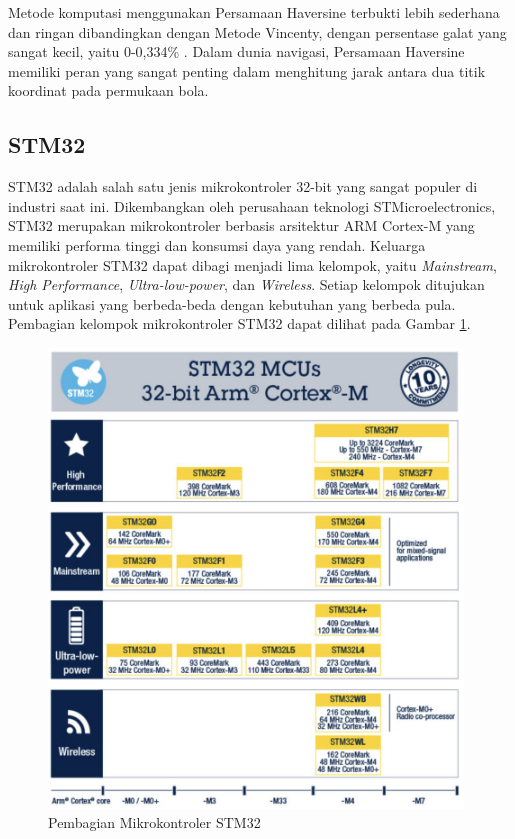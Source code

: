 Metode komputasi menggunakan Persamaan Haversine terbukti lebih sederhana dan ringan dibandingkan dengan Metode Vincenty, dengan persentase galat yang sangat kecil, yaitu 0-0,334\% \cite{Mahmoud2016}. Dalam dunia navigasi, Persamaan Haversine memiliki peran yang sangat penting dalam menghitung jarak antara dua titik koordinat pada permukaan bola.

\subsection{STM32}
STM32 adalah salah satu jenis mikrokontroler 32-bit yang sangat populer di industri saat ini. Dikembangkan oleh perusahaan teknologi STMicroelectronics, STM32 merupakan mikrokontroler berbasis arsitektur ARM Cortex-M yang memiliki performa tinggi dan konsumsi daya yang rendah. Keluarga mikrokontroler STM32 dapat dibagi menjadi lima kelompok, yaitu \textit{Mainstream}, \textit{High Performance}, \textit{Ultra-low-power}, dan \textit{Wireless}. Setiap kelompok ditujukan untuk aplikasi yang berbeda-beda dengan kebutuhan yang berbeda pula. Pembagian kelompok mikrokontroler STM32 dapat dilihat pada Gambar \ref{Fig: stm32-groups}.

\begin{figure}[H]
	\centering
	\includegraphics[width=11cm]{contents/chapter-2/stm-32-groups.png}
	\caption{Pembagian Mikrokontroler STM32 \cite{STMicroelectronics2023}}
	\label{Fig: stm32-groups}
\end{figure}

